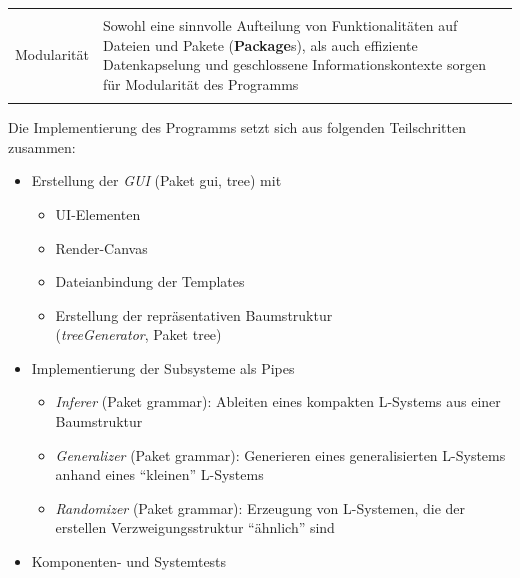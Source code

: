 \documentclass[11pt]{article}
\begin{document}
\begin{center}
\begin{tabular}{l|l}
            \\ \hline \\
            Modularität &
            \begin{minipage}[t]{0.8\textwidth}
                Sowohl eine sinnvolle Aufteilung von Funktionalitäten auf Dateien und Pakete (\textbf{Package}s), als
                auch effiziente Datenkapselung und geschlossene Informationskontexte sorgen für Modularität des
                Programms
            \end{minipage} \\
            \\ \hline
        \end{tabular}
    \end{center}

    \newpage

    Die Implementierung des Programms setzt sich aus folgenden Teilschritten zusammen:
    \begin{itemize}
        \item Erstellung der \textit{GUI} (Paket gui, tree) mit
        \begin{itemize}
            \item UI-Elementen
            \item Render-Canvas
            \item Dateianbindung der Templates
            \item Erstellung der repräsentativen Baumstruktur\\ (\textit{treeGenerator}, Paket tree)
        \end{itemize}
        \item Implementierung der Subsysteme als Pipes
        \begin{itemize}
            \item \textit{Inferer} (Paket grammar): Ableiten eines kompakten L-Systems aus einer Baumstruktur
            \item \textit{Generalizer} (Paket grammar): Generieren eines generalisierten L-Systems anhand eines
            "`kleinen"' L-Systems
            \item \textit{Randomizer} (Paket grammar): Erzeugung von L-Systemen, die der erstellen
            Verzweigungsstruktur "`ähnlich"' sind
        \end{itemize}
        \item Komponenten- und Systemtests
    \end{itemize}
\end{document}
